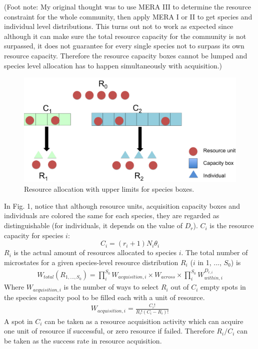 \documentclass[12pt]{article}
\begin{document}
(Foot note: My original thought was to use MERA III to determine the resource constraint for the whole community, then apply MERA I or II to get species and individual level distributions. This turns out not to work as expected since although it can make sure the total resource capacity for the community is not surpassed, it does not guarantee for every single species not to surpass its own resource capacity. Therefore the resource capacity boxes cannot be lumped  and species level allocation has to happen simultaneously with acquisition.)

\begin{figure}
\caption{Resource allocation with upper limits for species boxes.}
\includegraphics[width=\textwidth]{integrated_demo.pdf}
\end{figure}

In Fig. 1, notice that although resource units, acquisition capacity boxes and individuals are colored the same for each species, they are regarded as distinguishable (for individuals, it depends on the value of $D_r$). $C_i$ is the resource capacity for species $i$:
 \begin{equation}
C_i = (r_i+1)N_i \theta_i
\end{equation}
$R_i$ is the actual amount of resources allocated to species $i$. The total number of microstates for a given species-level resource distribution $R_i$ ($i$ in 1, ..., $S_0$) is
 \begin{equation}
 \begin{split}
W_{total}(R_{1,..., S_0})  =  \prod_i^{S_0}W_{acquisition,i} \times W_{across} \times\prod_i^{S_0}W_{within,i} ^{D_{r,i}}
\end{split}
\end{equation}
Where $W_{acquisition,i}$ is the number of ways to select $R_i$ out of $C_i$ empty spots in the species capacity pool to be filled each with a unit of resource. 
 \begin{equation}
 \begin{split}
W_{acquisition,i} = \frac{C_i!}{R_i! (C_i-R_i)!}
\end{split}
\end{equation}
A spot in $C_i$ can be taken as a resource acquisition activity which can acquire one unit of resource if successful, or zero resource if failed. Therefore $R_i/C_i$ can be taken as the success rate in resource acquisition. 
\end{document}
